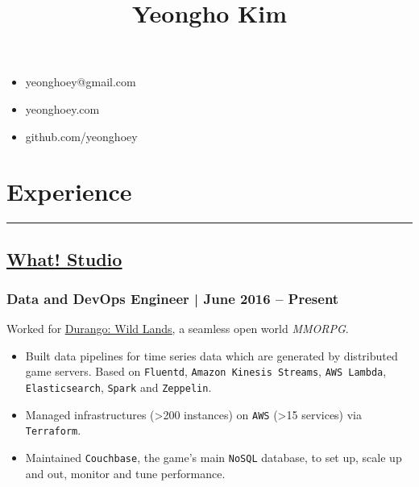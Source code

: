 \documentclass[11pt]{article}
\date{}
\title{Yeongho Kim}
\begin{document}
\maketitle
{}
\vspace{-14ex}

\begin{itemize}[itemindent=20.5em,label=\null,itemsep=-1ex]
\item yeonghoey@gmail.com
\item yeonghoey.com
\item github.com/yeonghoey
\end{itemize}

\vspace{-4ex}

\section*{Experience}
\label{sec:org12040dc}
\vspace{-4ex}

\noindent\rule{\textwidth}{0.5pt}
\vspace{-4ex}

\subsection*{\underline{\href{https://github.com/what-studio}{What! Studio}}}
\label{sec:orgc9bc116}
\subsubsection*{Data and DevOps Engineer | June 2016 – Present}
\label{sec:org2f4f430}
Worked for \uline{\href{https://durango.nexon.com/en}{Durango: Wild Lands}}, a seamless open world \emph{MMORPG}.

\begin{itemize}[label=$\circ$,itemsep=-0.5ex]
\item Built data pipelines for time series data which are generated by distributed game servers.
Based on \texttt{Fluentd}, \texttt{Amazon Kinesis Streams}, \texttt{AWS Lambda}, \texttt{Elasticsearch}, \texttt{Spark} and \texttt{Zeppelin}.
\item Managed infrastructures (>200 instances) on \texttt{AWS} (>15 services) via \texttt{Terraform}.
\item Maintained \texttt{Couchbase}, the game's main \texttt{NoSQL} database, to set up, scale up and out, monitor and tune performance.
\end{itemize}
\end{document}
